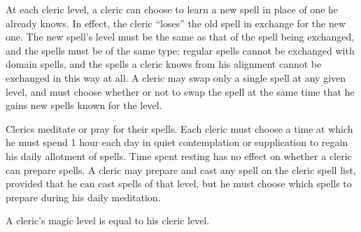\par At each cleric level, a cleric can choose to learn a
new spell in place of one he already knows. In effect, the cleric ``loses''
the old spell in exchange for the new one. The new spell's
level must be the same as that of the spell being exchanged, and the spells
must be of the same type; regular
spells cannot be exchanged with domain spells, and the spells a cleric knows
from his alignment cannot be exchanged in this way at all. A cleric may swap only a single
spell at any given level, and must choose whether or not to swap the
spell at the same time that he gains new spells known for the level.

Clerics meditate or pray for their spells. Each cleric must choose a time at which he must spend 1 hour each day in quiet contemplation or supplication to regain his daily allotment of spells. Time spent resting has no effect on whether a cleric can prepare spells. A cleric may prepare and cast any spell on the cleric spell list, provided that he can cast spells of that level, but he must choose which spells to prepare during his daily meditation.

A cleric's magic level is equal to his cleric level.

